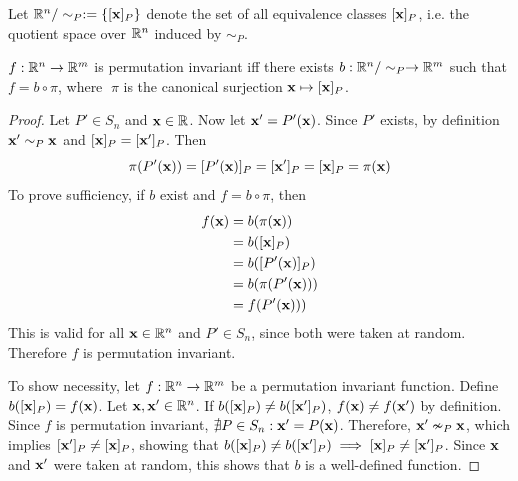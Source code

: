 \begin{appendices}
\begin{definition}
Let $\mathbb{R}^n/\sim_P:=\{[\mathbf{x}]_P\}$ denote the set of all equivalence classes $[\mathbf{x}]_P$, i.e. the quotient space over $\mathbb{R}^n$ induced by $\sim_P$. 
%
\end{definition}

\begin{lemma}
\label{lemma:permutation invariance}
$f:\mathbb{R}^n \to \mathbb{R}^m$ is permutation invariant iff
there exists $b : \mathbb{R}^n/\sim_P \to \mathbb{R}^m$ such that $f = b \circ \pi$,
where $\;\pi$ is the canonical surjection $\mathbf{x}\mapsto [\mathbf{x}]_P$.
\end{lemma}

\begin{proof}
Let $P' \in S_n$ and $\mathbf{x} \in \mathbb{R}$. Now let $\mathbf{x}'=P'(\mathbf{x})$. Since $P'$ exists, by definition $\mathbf{x}'\sim_P \mathbf{x}$ and $[\mathbf{x}]_P=[\mathbf{x}']_P$. Then 
\begin{equation}
    \label{eq:p1}
    \pi(P'(\mathbf{x})) = [P'(\mathbf{x})]_P
    = [\mathbf{x}']_P
    = [\mathbf{x}]_P
    = \pi(\mathbf{x})
\end{equation}
To prove sufficiency, if $b$ exist and $f=b\circ \pi$, then 
\begin{align}
    f(\mathbf{x}) &= b(\pi(\mathbf{x}))\nonumber\\
    &= b([\mathbf{x}]_P)\nonumber\\
    &= b([P'(\mathbf{x})]_P)\nonumber\\
    &= b(\pi(P'(\mathbf{x})))\nonumber\\
    &= f(P'(\mathbf{x})))
\end{align}
This is valid for all $\mathbf{x} \in \mathbb{R}^n$ and $P'\in S_n$, since both were taken at random. Therefore $f$ is permutation invariant.

To show necessity, let $f:\mathbb{R}^n \to \mathbb{R}^m$ be a permutation invariant function. Define $b([\mathbf{x}]_P)=f(\mathbf{x})$. Let $\mathbf{x},\mathbf{x}'\in \mathbb{R}^n$.
If $b([\mathbf{x}]_P) \neq b([\mathbf{x}']_P)$, $f(\mathbf{x}) \neq f(\mathbf{x}')$ by definition.
Since $f$ is permutation invariant, $\nexists P\in S_n : \mathbf{x}' = P(\mathbf{x})$. Therefore, $\mathbf{x}'\nsim_P \mathbf{x}$, which implies $[\mathbf{x}']_P \neq [\mathbf{x}]_P$, showing that $b([\mathbf{x}]_P) \neq b([\mathbf{x}']_P) \implies [\mathbf{x}]_P \neq [\mathbf{x}']_P$. Since $\mathbf{x}$ and $\mathbf{x}'$ were taken at random, this shows that $b$ is a well-defined function.
\end{proof}


\begin{definition}
\label{def:proxy}



\end{definition}
\end{appendices}
